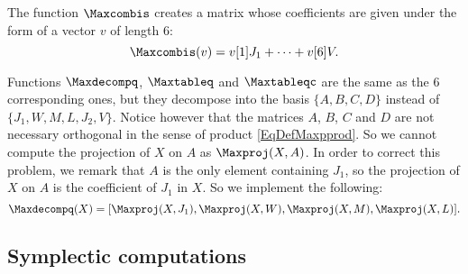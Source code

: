 The function $\Maxcombis$ creates a matrix whose coefficients are given under the form of a vector $v$ of length $6$:
\[ 
  \Maxcombis(v)=v[1]J_{1}+\cdots+v[6]V.
\]

Functions $\Maxdecompq$, $\Maxtableq$ and $\Maxtableqc$ are the same as the $6$ corresponding ones, but they decompose into the basis $\{A,B,C,D\}$ instead of  $\{ J_{1},W,M,L,J_{2},V \}$. Notice however that the matrices $A$, $B$, $C$ and $D$ are not necessary orthogonal in the sense of  product \eqref{EqDefMaxpprod}. So we cannot compute the projection of $X$ on $A$ as $\Maxproj(X,A)$. In order to correct this problem, we remark that $A$ is the only element containing $J_{1}$, so the projection of $X$ on $A$ is the coefficient of $J_{1}$ in $X$. So we implement the following:
\[ 
  \Maxdecompq(X)=[\Maxproj(X,J_{1}),\Maxproj(X,W),\Maxproj(X,M),\Maxproj(X,L)].
\]



\subsection{Symplectic computations}

